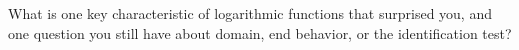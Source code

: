 \documentclass[10pt]{article}
\begin{document}
\vspace{0.1in}

\begin{reflectionbox}
What is one key characteristic of logarithmic functions that surprised you, and one question you
still have about domain, end behavior, or the identification test?

\end{reflectionbox}
\end{document}
